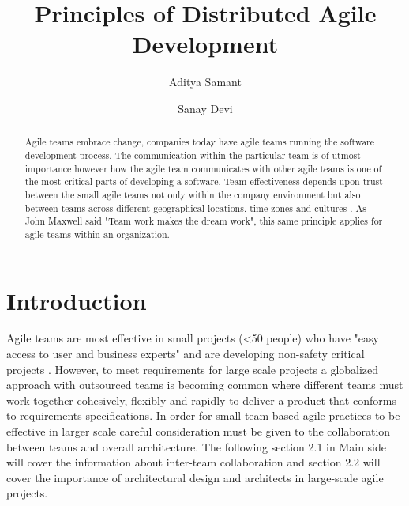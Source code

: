 \documentclass[sigplan,screen]{acmart}
\begin{document}
%
\title{Principles of Distributed Agile Development}

%

\author{Aditya Samant}

\author{Sanay Devi}

\begin{abstract}
Agile teams embrace change, companies today have agile teams running the software development process. The communication within the particular team is of utmost importance however how the agile team communicates with other agile teams is one of the most critical parts of developing a software. Team effectiveness depends upon trust between the small agile teams not only within the company environment but also between teams across different geographical locations, time zones and cultures \cite{Siva13}. As John Maxwell said "Team work makes the dream work", this same principle applies for agile teams within an organization. 
\end{abstract}

%


\section{Introduction}
Agile teams are most effective in small projects (<50 people) who have "easy access to user and business experts" and are developing non-safety critical projects \cite{Dingsøyr14}. However, to meet requirements for large scale projects a globalized approach with outsourced teams is becoming common \cite{Jeff} where different teams must work together cohesively, flexibly and rapidly to deliver  a product that conforms to requirements specifications. In order for small team based agile practices to be effective in larger scale careful consideration must be given to the collaboration between teams and overall architecture. The following section 2.1 in Main side will cover the information about inter-team collaboration and section 2.2 will cover the importance of architectural design and architects in large-scale agile projects. 
 
\end{document}
